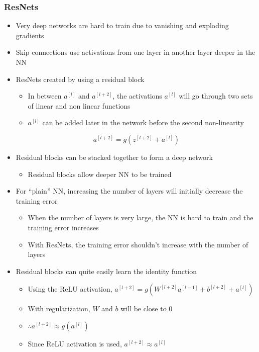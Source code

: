 \documentclass[12pt, letterpaper]{article}
\begin{document}
    \subsubsection{ResNets}
    \begin{itemize}
        \item Very deep networks are hard to train due to vanishing and exploding gradients
        \item Skip connections use activations from one layer in another layer deeper in the NN
        \item ResNets created by using a residual block
        \begin{itemize}
            \item In between $a^{[l]}$ and $a^{[l+2]}$, the activations $a^{[l]}$ will go through two sets of linear and non linear functions
            \item $a^{[l]}$ can be added later in the network before the second non-linearity
        \end{itemize}
        $$a^{[l+2]}=g(z^{[l+2]}+a^{[l]})$$
        \item  Residual blocks can be stacked together to form a deep network
        \begin{itemize}
            \item Residual blocks allow deeper NN to be trained
        \end{itemize}
        \item For ``plain'' NN, increasing the number of layers will initially decrease the training error
        \begin{itemize}
            \item When the number of layers is very large, the NN is hard to train and the training error increases
            \item With ResNets, the training error shouldn't increase with the number of layers
        \end{itemize}
        \item Residual blocks can quite easily learn the identity function
        \begin{itemize}
            \item Using the ReLU activation, $a^{[l+2]}=g(W^{[l+2]}a^{[l+1]}+b^{[l+2]}+a^{[l]})$
            \item With regularization, $W$ and $b$ will be close to 0
            \item $\therefore a^{[l+2]}\approx g(a^{[l]})$
            \item Since ReLU activation is used, $a^{[l+2]}\approx a^{[l]}$

\end{itemize}
\end{itemize}
\end{document}
